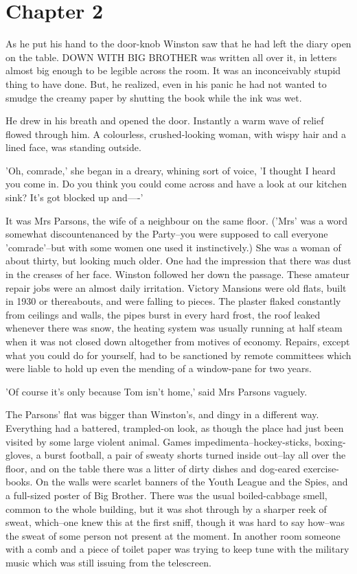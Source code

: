 \documentclass{article}
\begin{document}
\section{Chapter 2}



As he put his hand to the door-knob Winston saw that he had left the
diary open on the table. DOWN WITH BIG BROTHER was written all over it,
in letters almost big enough to be legible across the room. It was an
inconceivably stupid thing to have done. But, he realized, even in his
panic he had not wanted to smudge the creamy paper by shutting the book
while the ink was wet.

He drew in his breath and opened the door. Instantly a warm wave of relief
flowed through him. A colourless, crushed-looking woman, with wispy hair
and a lined face, was standing outside.

'Oh, comrade,' she began in a dreary, whining sort of voice, 'I thought I
heard you come in. Do you think you could come across and have a look at
our kitchen sink? It's got blocked up and----'

It was Mrs Parsons, the wife of a neighbour on the same floor. ('Mrs' was
a word somewhat discountenanced by the Party--you were supposed to call
everyone 'comrade'--but with some women one used it instinctively.) She was
a woman of about thirty, but looking much older. One had the impression
that there was dust in the creases of her face. Winston followed her down
the passage. These amateur repair jobs were an almost daily irritation.
Victory Mansions were old flats, built in 1930 or thereabouts, and were
falling to pieces. The plaster flaked constantly from ceilings and walls,
the pipes burst in every hard frost, the roof leaked whenever there was
snow, the heating system was usually running at half steam when it was not
closed down altogether from motives of economy. Repairs, except what you
could do for yourself, had to be sanctioned by remote committees which
were liable to hold up even the mending of a window-pane for two years.

'Of course it's only because Tom isn't home,' said Mrs Parsons vaguely.

The Parsons' flat was bigger than Winston's, and dingy in a different
way. Everything had a battered, trampled-on look, as though the
place had just been visited by some large violent animal. Games
impedimenta--hockey-sticks, boxing-gloves, a burst football, a pair of
sweaty shorts turned inside out--lay all over the floor, and on the
table there was a litter of dirty dishes and dog-eared exercise-books.
On the walls were scarlet banners of the Youth League and the Spies, and
a full-sized poster of Big Brother. There was the usual boiled-cabbage
smell, common to the whole building, but it was shot through by a sharper
reek of sweat, which--one knew this at the first sniff, though it was
hard to say how--was the sweat of some person not present at the moment.
In another room someone with a comb and a piece of toilet paper was
trying to keep tune with the military music which was still issuing
from the telescreen.
\end{document}
